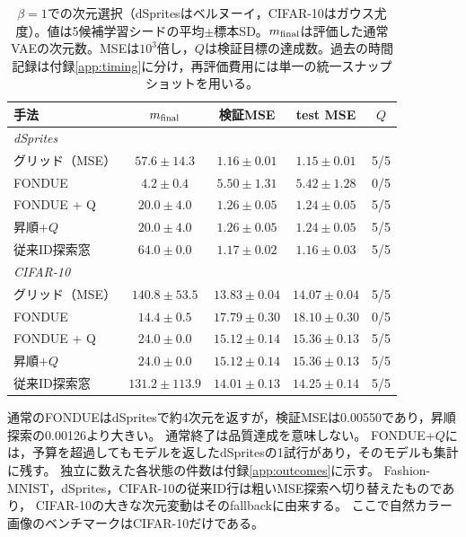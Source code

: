 \documentclass[11pt,a4paper]{ltjsarticle}
\begin{document}
\begin{table}[H]
\caption{$\beta=1$での次元選択（dSpritesはベルヌーイ，CIFAR-10はガウス尤度）。値は5候補学習シードの平均$\pm$標本SD。$m_{\rm final}$は評価した通常VAEの次元数。MSEは$10^3$倍し，$Q$は検証目標の達成数。過去の時間記録は付録\ref{app:timing}に分け，再評価費用には単一の統一スナップショットを用いる。}\label{tab:main2}
\footnotesize
\setlength{\tabcolsep}{3.5pt}
\begin{tabular*}{\textwidth}{@{\extracolsep{\fill}}lcccc@{}}
\toprule
手法 & $m_{\rm final}$ & 検証MSE & test MSE & $Q$ \\
\midrule
\multicolumn{5}{l}{\emph{dSprites}} \\
グリッド（MSE） & $57.6 \pm 14.3$ & $1.16 \pm 0.01$ & $1.15 \pm 0.01$ & 5/5 \\
FONDUE & $4.2 \pm 0.4$ & $5.50 \pm 1.31$ & $5.42 \pm 1.28$ & 0/5 \\
FONDUE + Q & $20.0 \pm 4.0$ & $1.26 \pm 0.05$ & $1.24 \pm 0.05$ & 5/5 \\
昇順+$Q$ & $20.0 \pm 4.0$ & $1.26 \pm 0.05$ & $1.24 \pm 0.05$ & 5/5 \\
従来ID探索窓 & $64.0 \pm 0.0$ & $1.17 \pm 0.02$ & $1.16 \pm 0.03$ & 5/5 \\
\midrule
\multicolumn{5}{l}{\emph{CIFAR-10}} \\
グリッド（MSE） & $140.8 \pm 53.5$ & $13.83 \pm 0.04$ & $14.07 \pm 0.04$ & 5/5 \\
FONDUE & $14.4 \pm 0.5$ & $17.79 \pm 0.30$ & $18.10 \pm 0.30$ & 0/5 \\
FONDUE + Q & $24.0 \pm 0.0$ & $15.12 \pm 0.14$ & $15.36 \pm 0.13$ & 5/5 \\
昇順+$Q$ & $24.0 \pm 0.0$ & $15.12 \pm 0.14$ & $15.36 \pm 0.13$ & 5/5 \\
従来ID探索窓 & $131.2 \pm 113.9$ & $14.01 \pm 0.13$ & $14.25 \pm 0.14$ & 5/5 \\
\bottomrule
\end{tabular*}
\end{table}

通常のFONDUEはdSpritesで約4次元を返すが，検証MSEは0.00550であり，昇順探索の0.00126より大きい。
通常終了は品質達成を意味しない。
FONDUE+$Q$には，予算を超過してもモデルを返したdSpritesの1試行があり，そのモデルも集計に残す。
独立に数えた各状態の件数は付録\ref{app:outcomes}に示す。
Fashion-MNIST，dSprites，CIFAR-10の従来ID行は粗いMSE探索へ切り替えたものであり，
CIFAR-10の大きな次元変動はそのfallbackに由来する。
ここで自然カラー画像のベンチマークはCIFAR-10だけである。
\end{document}
